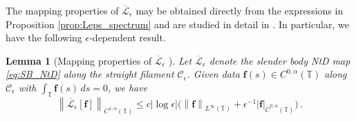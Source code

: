 \documentclass[11pt,reqno]{amsart}
\newcommand{\T}{\mathbb{T}}
\newcommand{\abs}[1]{\left\lvert #1 \right\rvert}
\newcommand{\norm}[1]{\left\lVert #1 \right\rVert}
\newcommand{\mc}[1]{\mathcal{#1}}
\newtheorem{lemma}[theorem]{Lemma}
\theoremstyle{definition}
\begin{document}
The mapping properties of $\overline{\mc{L}}_\epsilon$ may be obtained directly from the expressions in Proposition \ref{prop:Leps_spectrum} and are studied in detail in \cite{ohm2024free}. In particular, we have the following $\epsilon$-dependent result. 
%
%
\begin{lemma}[Mapping properties of $\overline{\mc{L}}_\epsilon$ \cite{ohm2024free}]\label{lem:straight_Leps}
Let $\overline{\mc{L}}_\epsilon$ denote the slender body NtD map \eqref{eq:SB_NtD} along the straight filament $\mc{C}_\epsilon$. Given data $\bm{f}(s)\in C^{0,\alpha}(\T)$ along $\mc{C}_\epsilon$ with $\int_\T\bm{f}(s)\,ds=0$, we have 
\begin{equation}\label{eq:holder_NtD}
\norm{\overline{\mc{L}}_\epsilon[\bm{f}]}_{C^{1,\alpha}(\T)} \le c\abs{\log\epsilon}\big(\norm{\bm{f}}_{L^\infty(\T)}+\epsilon^{-1}\abs{\bm{f}}_{\dot C^{0,\alpha}(\T)} \big)\,.
\end{equation}
\end{lemma}
\end{document}

